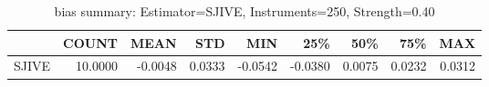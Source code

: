 \begin{table}[ht]
\centering
\caption{bias summary: Estimator=SJIVE, Instruments=250, Strength=0.40}
\begin{tabular}{lrrrrrrrr}
\toprule
 & COUNT & MEAN & STD & MIN & 25\% & 50\% & 75\% & MAX \\
\midrule
SJIVE & 10.0000 & -0.0048 & 0.0333 & -0.0542 & -0.0380 & 0.0075 & 0.0232 & 0.0312 \\
\bottomrule
\end{tabular}
\end{table}
